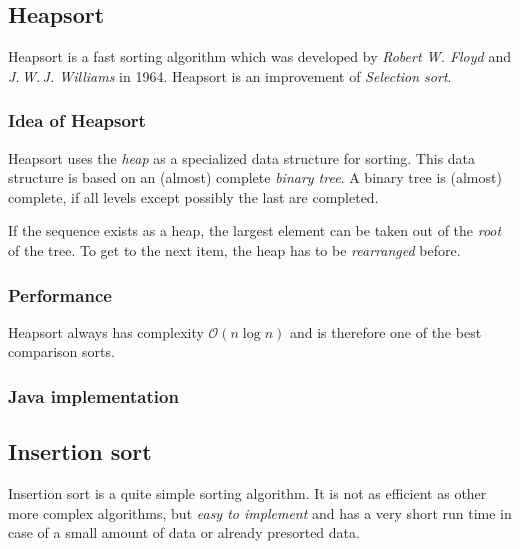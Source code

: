 \documentclass[nobranding]{pfBook}
\newcommand{\OO}{\mathcal{O}}
\begin{document}
	
	
	\subsection{Heapsort}
	
	Heapsort is a fast sorting algorithm which was developed by \emph{Robert W. Floyd} and \emph{J.\,W.\,J. Williams} in 1964. Heapsort is an improvement of \emph{Selection sort}.
	
	\subsubsection{Idea of Heapsort}
	
	Heapsort uses the \emph{heap} as a specialized data structure for sorting. This data structure is based on an (almost) complete \emph{binary tree}. A binary tree is (almost) complete, if all levels except possibly the last are completed.
	
	If the sequence exists as a heap, the largest element can be taken out of the \emph{root} of the tree. To get to the next item, the heap has to be \emph{rearranged} before.
	
	\subsubsection{Performance}
	
	Heapsort always has complexity $\OO(n \log n)$ and is therefore one of the best comparison sorts.
	
	\subsubsection{Java implementation}
	
	
	
	\subsection{Insertion sort}
	
	Insertion sort is a quite simple sorting algorithm. It is not as efficient as other more complex algorithms, but \emph{easy to implement} and has a very short run time in case of a small amount of data or already presorted data.
	
\end{document}
